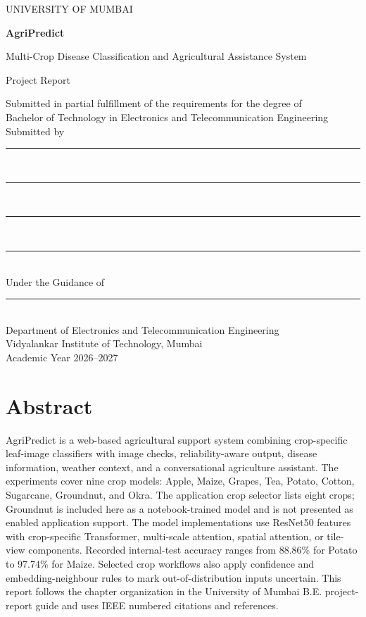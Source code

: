 \documentclass[12pt,a4paper,oneside]{report}
\begin{document}
\begin{titlepage}\centering
{\large UNIVERSITY OF MUMBAI\par}\vspace{1.1cm}
{\Huge\bfseries AgriPredict\par}\vspace{0.3cm}
{\Large Multi-Crop Disease Classification and Agricultural Assistance System\par}\vspace{0.9cm}
{\large Project Report\par}\vspace{0.7cm}
Submitted in partial fulfillment of the requirements for the degree of\\
Bachelor of Technology in Electronics and Telecommunication Engineering\\[0.8cm]
Submitted by\\[0.2cm]
\rule{8cm}{0.3pt}\\[0.25cm]\rule{8cm}{0.3pt}\\[0.25cm]\rule{8cm}{0.3pt}\\[0.25cm]\rule{8cm}{0.3pt}\\[0.75cm]
Under the Guidance of\\\rule{8cm}{0.3pt}\\[0.9cm]
Department of Electronics and Telecommunication Engineering\\
Vidyalankar Institute of Technology, Mumbai\\Academic Year 2026--2027
\end{titlepage}
\chapter*{Abstract}
AgriPredict is a web-based agricultural support system combining crop-specific leaf-image classifiers with image checks, reliability-aware output, disease information, weather context, and a conversational agriculture assistant. The experiments cover nine crop models: Apple, Maize, Grapes, Tea, Potato, Cotton, Sugarcane, Groundnut, and Okra. The application crop selector lists eight crops; Groundnut is included here as a notebook-trained model and is not presented as enabled application support. The model implementations use ResNet50 features with crop-specific Transformer, multi-scale attention, spatial attention, or tile-view components. Recorded internal-test accuracy ranges from 88.86\% for Potato to 97.74\% for Maize. Selected crop workflows also apply confidence and embedding-neighbour rules to mark out-of-distribution inputs uncertain. This report follows the chapter organization in the University of Mumbai B.E. project-report guide and uses IEEE numbered citations and references.
\end{document}
